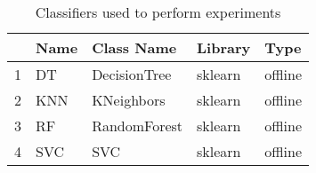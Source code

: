 \begin{table}
\footnotesize
\caption{Classifiers used to perform experiments}
\label{tab:algorithm}
\begin{tabular}{lllll}
\hline
 & Name & Class Name & Library & Type \\
\hline
1 & DT & DecisionTree & sklearn & offline \\
2 & KNN & KNeighbors & sklearn & offline \\
3 & RF & RandomForest & sklearn & offline \\
4 & SVC & SVC & sklearn & offline \\
\hline
\end{tabular}
\end{table}
